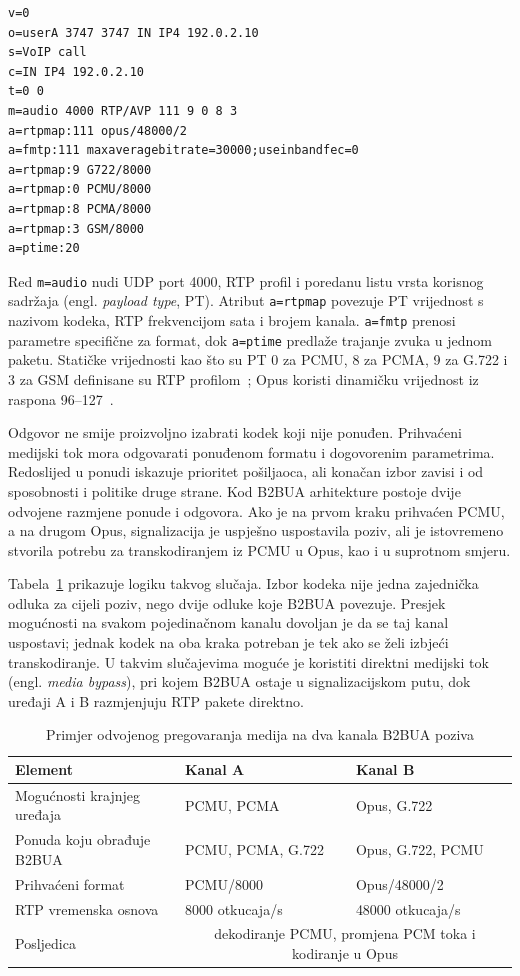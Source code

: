 \begin{lstlisting}
v=0
o=userA 3747 3747 IN IP4 192.0.2.10
s=VoIP call
c=IN IP4 192.0.2.10
t=0 0
m=audio 4000 RTP/AVP 111 9 0 8 3
a=rtpmap:111 opus/48000/2
a=fmtp:111 maxaveragebitrate=30000;useinbandfec=0
a=rtpmap:9 G722/8000
a=rtpmap:0 PCMU/8000
a=rtpmap:8 PCMA/8000
a=rtpmap:3 GSM/8000
a=ptime:20
\end{lstlisting}

Red \texttt{m=audio} nudi UDP port 4000, RTP profil i poredanu listu vrsta korisnog sadržaja (engl. \emph{payload type}, PT). Atribut \texttt{a=rtpmap} povezuje PT vrijednost s nazivom kodeka, RTP frekvencijom sata i brojem kanala. \texttt{a=fmtp} prenosi parametre specifične za format, dok \texttt{a=ptime} predlaže trajanje zvuka u jednom paketu. Statičke vrijednosti kao što su PT 0 za PCMU, 8 za PCMA, 9 za G.722 i 3 za GSM definisane su RTP profilom~\cite{rfc3551}; Opus koristi dinamičku vrijednost iz raspona 96--127~\cite{rfc7587}.

Odgovor ne smije proizvoljno izabrati kodek koji nije ponuđen. Prihvaćeni medijski tok mora odgovarati ponuđenom formatu i dogovorenim parametrima. Redoslijed u ponudi iskazuje prioritet pošiljaoca, ali konačan izbor zavisi i od sposobnosti i politike druge strane. Kod B2BUA arhitekture postoje dvije odvojene razmjene ponude i odgovora. Ako je na prvom kraku prihvaćen PCMU, a na drugom Opus, signalizacija je uspješno uspostavila poziv, ali je istovremeno stvorila potrebu za transkodiranjem iz PCMU u Opus, kao i u suprotnom smjeru.

Tabela~\ref{tab:sdp-two-legs} prikazuje logiku takvog slučaja. Izbor kodeka nije jedna zajednička odluka za cijeli poziv, nego dvije odluke koje B2BUA povezuje. Presjek mogućnosti na svakom pojedinačnom kanalu dovoljan je da se taj kanal uspostavi; jednak kodek na oba kraka potreban je tek ako se želi izbjeći transkodiranje. U takvim slučajevima moguće je koristiti direktni medijski tok (engl. \emph{media bypass}), pri kojem B2BUA ostaje u signalizacijskom putu, dok uređaji A i B razmjenjuju RTP pakete direktno.

\begin{table}[htbp]
\centering
\caption{Primjer odvojenog pregovaranja medija na dva kanala B2BUA poziva}
\label{tab:sdp-two-legs}
\small
\begin{tabularx}{\textwidth}{|l|X|X|}
\hline
\textbf{Element} & \textbf{Kanal A} & \textbf{Kanal B} \\
\hline
Mogućnosti krajnjeg uređaja & PCMU, PCMA & Opus, G.722 \\
Ponuda koju obrađuje B2BUA & PCMU, PCMA, G.722 & Opus, G.722, PCMU \\
Prihvaćeni format & PCMU/8000 & Opus/48000/2 \\
RTP vremenska osnova & 8000 otkucaja/s & 48000 otkucaja/s \\
Posljedica & \multicolumn{2}{c|}{dekodiranje PCMU, promjena PCM toka i kodiranje u Opus} \\
\hline
\end{tabularx}
\end{table}

